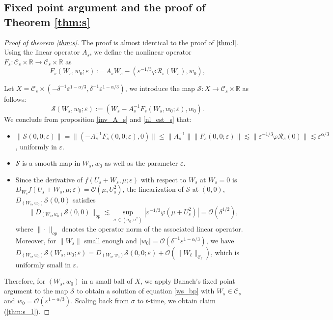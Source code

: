 \documentclass[letterpaper,11pt]{article}
\newcommand{\Ral}{\mathcal{R}}
\newcommand{\rmO}{\mathcal{O}}
\newcommand{\eps}{\varepsilon}
\newcommand{\lar}{ \lesssim }
\numberwithin{equation}{section}
\theoremstyle{plain}
\begin{document}
\subsection{Fixed point argument and the proof of Theorem \ref{thm:s}}
\begin{proof}[Proof of theorem \ref{thm:s}]
The proof is almost identical to the proof of \ref{thm:l}. Using the linear operator $A_s$, we define the nonlinear operator
$F_s : \mathcal{C}_s \times \mathbb{R} \to \mathcal{C}_s \times \mathbb{R}$ as
\[
F_s(W_s, w_0; \eps) := A_s W_s - (\eps^{-1/3}\varphi \Ral_s(W_s), w_0),
\]

Let $X = \mathcal{C}_s \times (-\delta^{-1}\eps^{1-\alpha/3},\delta^{-1}\eps^{1-\alpha/3})$, we introduce the map $\mathcal{S}: X \to \mathcal{C}_s \times \mathbb{R}$ as follows:
\[
\mathcal{S}(W_s,w_0; \eps) := (W_s-A_s^{-1}F_s(W_s,w_0;\eps), w_0).
\]
We conclude from proposition \ref{inv_A_s} and \ref{nl_est_s} that:
\begin{itemize}
\item $\|\mathcal{S}(0,0;\eps) \|= \|\left( -A_s^{-1}F_s(0,0;\eps),0\right)\| \le \|A_s^{-1}\|\|F_s(0,0;\eps)\| \lar \|\eps^{-1/3}\varphi \Ral_s(0)\| \lar \eps^{\alpha/3}$, uniformly in $\eps$.

\item $\mathcal{S}$ is a smooth map in $W_s,w_0$ as well as the parameter $\eps$.

\item Since the derivative of $f(U_s+W_s,\mu;\eps)$ with respect to $W_s$ at $W_s=0$ is $D_{W_s} f(U_s+W_s,\mu;\eps)=\rmO(\mu, U_s^2)$, the linearization of $\mathcal{S}$ at $(0,0)$, $D_{(W_s,w_0)} \mathcal{S}(0,0)$ satisfies
\[
\|D_{(W_s,w_0)} \mathcal{S}(0,0)\|_{op} \lar \sup_{\sigma \in (\sigma_0,\sigma^*)}|\eps^{-1/3}\varphi(\mu+U_s^2)| = \rmO(\delta^{1/2}),
\]
where $\|\cdot\|_{op}$ denotes the operator norm of the associated linear operator.
Moreover, for $\|W_{s}\|$ small enough and $|w_0| =\rmO(\delta^{-1}\eps^{1-\alpha/3})$, we have $D_{(W_s,w_0)}\mathcal{S}(W_s,w_0;\eps) =  D_{(W_s,w_0)}\mathcal{S}(0,0;\eps)+\rmO(\|W_\ell\|_{\mathcal{C}_\ell})$, which is uniformly small in $\eps$.


\end{itemize}

Therefore, for $(W_s, w_0)$ in a small ball of $X$, we apply Banach's fixed point argument to the map $\mathcal{S}$ to obtain a solution of equation \eqref{ws_bp} with $W_s \in \mathcal{C}_s$ and $w_0 = \rmO(\eps^{1-\alpha/3})$. Scaling back from $\sigma$ to $t$-time, we obtain claim (\ref{thm:s_1}).
\end{proof}
\end{document}
